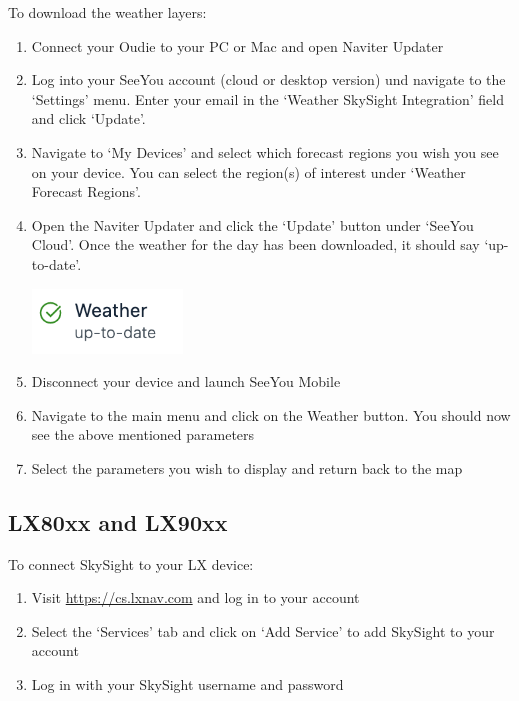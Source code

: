 \documentclass[11pt,a4paper]{article}
\begin{document}
To download the weather layers:

\begin{enumerate}
\item Connect your Oudie to your PC or Mac and open Naviter Updater
\item Log into your SeeYou account (cloud or desktop version) und navigate to the `Settings' menu. Enter your email in the `Weather SkySight Integration' field and click `Update'.



\item Navigate to `My Devices' and select which forecast regions you wish you see on your device. You can select the region(s) of interest under `Weather Forecast Regions'.
\item Open the Naviter Updater and click the `Update' button under `SeeYou Cloud'. Once the weather for the day has been downloaded, it should say `up-to-date'. 

\begin{center}
\includegraphics[width=4cm]{images/weather_downloaded.png}
\end{center}
 
\item Disconnect your device and launch SeeYou Mobile
\item Navigate to the main menu and click on the Weather button. You should now see the above mentioned parameters
\item Select the parameters you wish to display and return back to the map

\end{enumerate}

\subsection{LX80xx and LX90xx}\label{subsec:lx}
To connect SkySight to your LX device:

\begin{enumerate}
\item Visit \url{https://cs.lxnav.com} and log in to your account
\item Select the `Services' tab and click on `Add Service' to add SkySight to your account
\item Log in with your SkySight username and password
\end{enumerate}
\end{document}
